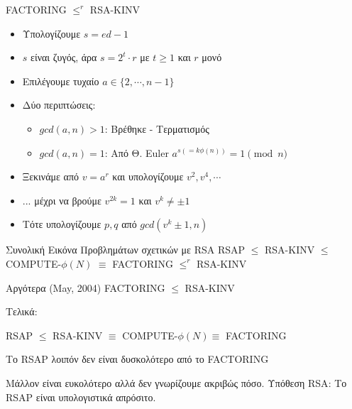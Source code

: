 \documentclass[handout]{beamer}
\begin{document}
\begin{frame}{FACTORING $\leq^r$ RSA-KINV}
\begin{itemize}
\item Υπολογίζουμε $s = ed -1$ \pause
\item $s$ είναι ζυγός, άρα $s = 2^t \cdot r$ με $t \geq 1$ και $r$ μονό \pause
\item Επιλέγουμε τυχαίο $a \in \{2, \cdots, n-1 \}$ \pause
\item Δύο περιπτώσεις: 
\begin{itemize}
    \item $gcd(a,n) > 1$: Βρέθηκε - Τερματισμός \pause
    \item $gcd(a,n) = 1$: Από Θ. Euler $a^{s(=k\phi(n))}  =  1 \pmod n$ \pause
\end{itemize}
\item Ξεκινάμε από $v = a^r$ και υπολογίζουμε $v^2,v^4, \cdots$ \pause
\item ... μέχρι να βρούμε $v^{2k} = 1$ και $v^{k} \neq \pm 1$ \pause
\item Τότε υπολογίζουμε $p,q$ από $gcd(v^{k} \pm 1,n)$
\end{itemize}
\end{frame}

\begin{frame}{Συνολική Εικόνα Προβλημάτων σχετικών με RSA}
RSAP $\leq$ RSA-ΚINV $\leq$ COMPUTE-$\phi(N)$ $\equiv$ FACTORING $\leq^r$ RSA-KINV

\pause
Αργότερα (May, 2004)
FACTORING $\leq$ RSA-KINV
\pause

Tελικά:

RSAP $\leq$ RSA-ΚINV $\equiv$ COMPUTE-$\phi(N) \equiv$ FACTORING
 
\pause
Το RSAP λοιπόν δεν είναι δυσκολότερο από το FACTORING

Μάλλον είναι ευκολότερο αλλά δεν γνωρίζουμε ακριβώς πόσο.
\pause
\alert{Υπόθεση RSA}: Το RSAP είναι υπολογιστικά απρόσιτο.

\end{frame}
\end{document}

